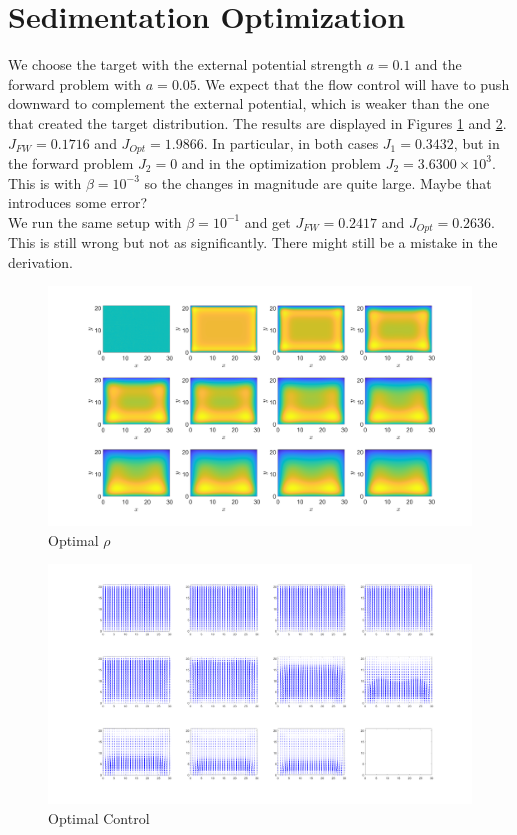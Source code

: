 \documentclass[11pt, a4paper]{article}
\theoremstyle{definition}
\begin{document}
\section{Sedimentation Optimization}
We choose the target with the external potential strength $ a = 0.1$ and the forward problem with $a = 0.05$. We expect that the flow control will have to push downward to complement the external potential, which is weaker than the one that created the target distribution. The results are displayed in Figures \ref{F3a} and \ref{F3b}.$J_{FW} = 0.1716$ and $J_{Opt} = 1.9866$.
In particular, in both cases $J_1 = 0.3432$, but in the forward problem $J_2 = 0$ and in the optimization problem $J_2 = 3.6300 \times 10^3$. This is with $\beta = 10^{-3}$ so the changes in magnitude are quite large. Maybe that introduces some error?\\
We run the same setup with $\beta = 10^{-1}$ and get $J_{FW} = 0.2417$ and $J_{Opt} = 0.2636$. This is still wrong but not as significantly. There might still be a mistake in the derivation.
	\begin{figure}[h]
	\centering
	\includegraphics[scale=0.25]{SedOpt1.png}
	\caption{Optimal $\rho$} 
	\label{F3a}
	\end{figure}
	\begin{figure}[h]
	\centering
	\includegraphics[scale=0.25]{SedOpt2.png}
	\caption{Optimal Control} 
	\label{F3b}
	\end{figure}
\end{document}
